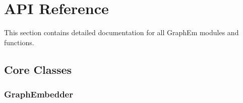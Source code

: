 \documentclass[letterpaper,10pt,english]{sphinxmanual}
\begin{document}
\sphinxstepscope


\chapter{API Reference}
\label{\detokenize{api_reference:api-reference}}\label{\detokenize{api_reference::doc}}
\sphinxAtStartPar
This section contains detailed documentation for all GraphEm modules and functions.


\section{Core Classes}
\label{\detokenize{api_reference:core-classes}}

\subsection{GraphEmbedder}
\label{\detokenize{api_reference:graphembedder}}
\end{document}
